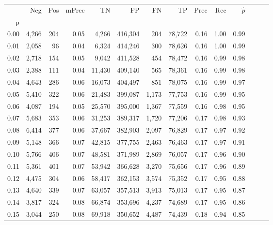 \begin{tabular}{rrrrrrrrrrrrrr}
\toprule
{} &    Neg &    Pos & mPrec &       TN &       FP &      FN &      TP &  Prec &   Rec & $\hat{p}$ \\
p    &        &        &       &          &          &         &         &       &       &           \\
\midrule
0.00 &  4,266 &    204 &  0.05 &    4,266 &  416,304 &     204 &  78,722 &  0.16 &  1.00 &      0.99 \\
0.01 &  2,058 &     96 &  0.04 &    6,324 &  414,246 &     300 &  78,626 &  0.16 &  1.00 &      0.99 \\
0.02 &  2,718 &    154 &  0.05 &    9,042 &  411,528 &     454 &  78,472 &  0.16 &  0.99 &      0.98 \\
0.03 &  2,388 &    111 &  0.04 &   11,430 &  409,140 &     565 &  78,361 &  0.16 &  0.99 &      0.98 \\
0.04 &  4,643 &    286 &  0.06 &   16,073 &  404,497 &     851 &  78,075 &  0.16 &  0.99 &      0.97 \\
0.05 &  5,410 &    322 &  0.06 &   21,483 &  399,087 &   1,173 &  77,753 &  0.16 &  0.99 &      0.95 \\
0.06 &  4,087 &    194 &  0.05 &   25,570 &  395,000 &   1,367 &  77,559 &  0.16 &  0.98 &      0.95 \\
0.07 &  5,683 &    353 &  0.06 &   31,253 &  389,317 &   1,720 &  77,206 &  0.17 &  0.98 &      0.93 \\
0.08 &  6,414 &    377 &  0.06 &   37,667 &  382,903 &   2,097 &  76,829 &  0.17 &  0.97 &      0.92 \\
0.09 &  5,148 &    366 &  0.07 &   42,815 &  377,755 &   2,463 &  76,463 &  0.17 &  0.97 &      0.91 \\
0.10 &  5,766 &    406 &  0.07 &   48,581 &  371,989 &   2,869 &  76,057 &  0.17 &  0.96 &      0.90 \\
0.11 &  5,361 &    401 &  0.07 &   53,942 &  366,628 &   3,270 &  75,656 &  0.17 &  0.96 &      0.89 \\
0.12 &  4,475 &    304 &  0.06 &   58,417 &  362,153 &   3,574 &  75,352 &  0.17 &  0.95 &      0.88 \\
0.13 &  4,640 &    339 &  0.07 &   63,057 &  357,513 &   3,913 &  75,013 &  0.17 &  0.95 &      0.87 \\
0.14 &  3,817 &    324 &  0.08 &   66,874 &  353,696 &   4,237 &  74,689 &  0.17 &  0.95 &      0.86 \\
0.15 &  3,044 &    250 &  0.08 &   69,918 &  350,652 &   4,487 &  74,439 &  0.18 &  0.94 &      0.85 \\

\end{tabular}
